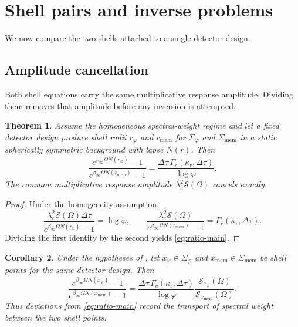 \documentclass[11pt]{amsart}
\numberwithin{equation}{section}
\newtheorem{theorem}{Theorem}[section]
\newtheorem{corollary}[theorem]{Corollary}
\theoremstyle{remark}
\begin{document}
\section{Shell pairs and inverse problems}\label{sec:inverse}

We now compare the two shells attached to a single detector design.

\subsection{Amplitude cancellation}

Both shell equations carry the same multiplicative response amplitude. Dividing them removes that amplitude before any inversion is attempted.

\begin{theorem}\label{thm:ratio-main}
Assume the homogeneous spectral-weight regime and let a fixed detector design produce shell radii $r_{\varphi}$ and $r_{\mathrm{mem}}$ for $\Sigma_{\varphi}$ and $\Sigma_{\mathrm{mem}}$ in a static spherically symmetric background with lapse $N(r)$. Then
\begin{equation}\label{eq:ratio-main}
\frac{e^{\beta_\infty\Omega N(r_{\varphi})}-1}
     {e^{\beta_\infty\Omega N(r_{\mathrm{mem}})}-1}
=
\frac{\Delta\tau\,\Gamma_c(\kappa_{\mathrm r},\Delta\tau)}{\log\varphi}.
\end{equation}
The common multiplicative response amplitude $\lambda_c^2\mathcal S(\Omega)$ cancels exactly.
\end{theorem}

\begin{proof}
Under the homogeneity assumption,
\[
\frac{\lambda_c^2\mathcal S(\Omega)\Delta\tau}
{e^{\beta_\infty\Omega N(r_{\varphi})}-1}
=\log\varphi,
\qquad
\frac{\lambda_c^2\mathcal S(\Omega)}
{e^{\beta_\infty\Omega N(r_{\mathrm{mem}})}-1}
=\Gamma_c(\kappa_{\mathrm r},\Delta\tau).
\]
Dividing the first identity by the second yields \eqref{eq:ratio-main}.
\end{proof}

\begin{corollary}\label{cor:spectral-transport-main}
Under the hypotheses of , let $x_{\varphi}\in\Sigma_{\varphi}$ and $x_{\mathrm{mem}}\in\Sigma_{\mathrm{mem}}$ be shell points for the same detector design. Then
\begin{equation}\label{eq:spectral-transport-main}
\frac{e^{\beta_\infty\Omega N(x_{\varphi})}-1}
     {e^{\beta_\infty\Omega N(x_{\mathrm{mem}})}-1}
=
\frac{\Delta\tau\,\Gamma_c(\kappa_{\mathrm r},\Delta\tau)}{\log\varphi}
\frac{\mathcal S_{x_{\varphi}}(\Omega)}{\mathcal S_{x_{\mathrm{mem}}}(\Omega)}.
\end{equation}
Thus deviations from \eqref{eq:ratio-main} record the transport of spectral weight between the two shell points.
\end{corollary}
\end{document}
